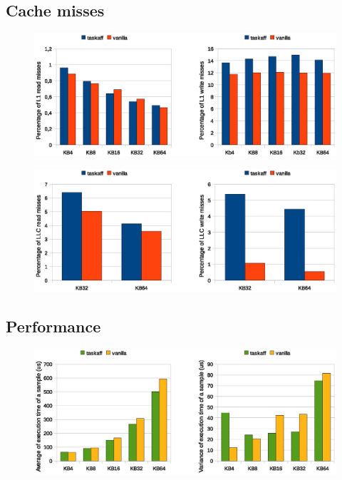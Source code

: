 \subsection{Cache misses}


\begin{figure}[htbp]
\centering
\includegraphics[width=\widefigure]{images/results_xeon/l1_load_store_xeon.eps}
\caption{}
\label{fig:l1_load_store_xeon}
\end{figure}

\begin{figure}[htbp]
\centering
\includegraphics[width=\widefigure]{images/results_xeon/l2_load_store_xeon.eps}
\caption{}
\label{fig:l2_load_store_xeon}
\end{figure}


\subsection{Performance}

\begin{figure}[htbp]
\centering
\includegraphics[width=\widefigure]{images/results_xeon/time_avg_var.eps}
\caption{}
\label{fig:time_avg_var_xeon}
\end{figure}
\newpage

